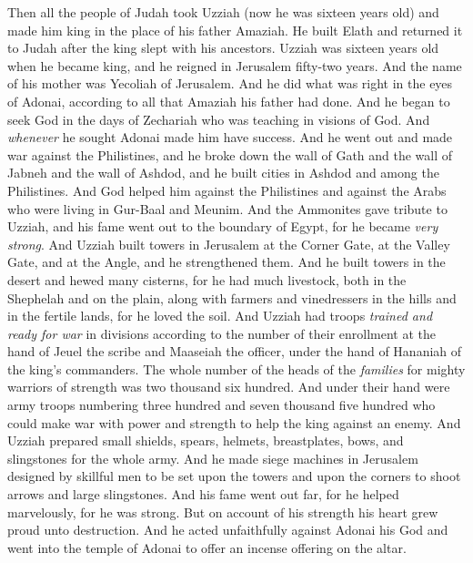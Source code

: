 \begin{biblechapter} %
 Then all the people of Judah took Uzziah (now he was sixteen years old) and made him king in the place of his father Amaziah.
\verse He built Elath and returned it to Judah after the king slept with his ancestors.
\verse Uzziah was sixteen years old when he became king, and he reigned in Jerusalem fifty-two years. And the name of his mother was Yecoliah of Jerusalem.
\verse And he did what was right in the eyes of Adonai, according to all that Amaziah his father had done.
\verse And he began to seek God in the days of Zechariah who was teaching in visions of God. And \textit{whenever} he sought Adonai made him have success.
\verse And he went out and made war against the Philistines, and he broke down the wall of Gath and the wall of Jabneh and the wall of Ashdod, and he built cities in Ashdod and among the Philistines.
\verse And God helped him against the Philistines and against the Arabs who were living in Gur-Baal and Meunim.
\verse And the Ammonites gave tribute to Uzziah, and his fame went out to the boundary of Egypt, for he became \textit{very strong}.
\verse And Uzziah built towers in Jerusalem at the Corner Gate, at the Valley Gate, and at the Angle, and he strengthened them.
\verse And he built towers in the desert and hewed many cisterns, for he had much livestock, both in the Shephelah and on the plain, along with farmers and vinedressers in the hills and in the fertile lands, for he loved the soil.
\verse And Uzziah had troops \textit{trained and ready for war} in divisions according to the number of their enrollment at the hand of Jeuel the scribe and Maaseiah the officer, under the hand of Hananiah of the king’s commanders.
\verse The whole number of the heads of the \textit{families} for mighty warriors of strength was two thousand six hundred.
\verse And under their hand were army troops numbering three hundred and seven thousand five hundred who could make war with power and strength to help the king against an enemy.
\verse And Uzziah prepared small shields, spears, helmets, breastplates, bows, and slingstones for the whole army.
\verse And he made siege machines in Jerusalem designed by skillful men to be set upon the towers and upon the corners to shoot arrows and large slingstones. And his fame went out far, for he helped marvelously, for he was strong.
\verse But on account of his strength his heart grew proud unto destruction. And he acted unfaithfully against Adonai his God and went into the temple of Adonai to offer an incense offering on the altar.

\end{biblechapter}
